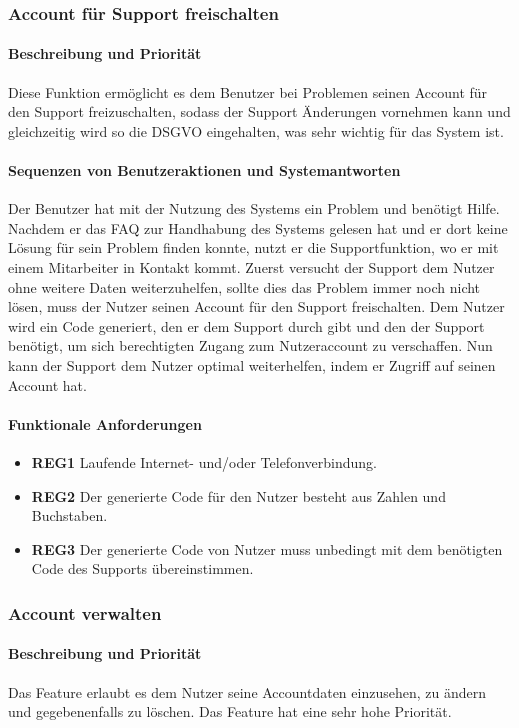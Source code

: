 \subsubsection{Account für Support freischalten}
\label{sys_feat:freischalten}
\paragraph{Beschreibung und Priorität}
Diese Funktion ermöglicht es dem Benutzer bei Problemen seinen Account für den Support freizuschalten, sodass der Support Änderungen vornehmen kann und gleichzeitig wird so die DSGVO eingehalten, was sehr wichtig für das System ist.
\paragraph{Sequenzen von Benutzeraktionen und Systemantworten} 
Der Benutzer hat mit der Nutzung des Systems ein Problem und benötigt Hilfe. Nachdem er das FAQ zur Handhabung des Systems gelesen hat und er dort keine Lösung für sein Problem finden konnte, nutzt er die Supportfunktion, wo er mit einem Mitarbeiter in Kontakt kommt. Zuerst versucht der Support dem Nutzer ohne weitere Daten weiterzuhelfen, sollte dies das Problem immer noch nicht lösen, muss der Nutzer seinen Account für den Support freischalten. Dem Nutzer wird ein Code generiert, den er dem Support durch gibt und den der Support benötigt, um sich berechtigten Zugang zum Nutzeraccount zu verschaffen. Nun kann der  Support dem Nutzer optimal weiterhelfen, indem er Zugriff auf seinen Account hat.
\paragraph{Funktionale Anforderungen}
\begin{itemize}
	\item \textbf{REG1} Laufende Internet- und/oder Telefonverbindung.
	\item \textbf{REG2} Der generierte Code für den Nutzer besteht aus Zahlen und Buchstaben.
	\item \textbf{REG3} Der generierte Code von Nutzer muss unbedingt mit dem benötigten Code des Supports übereinstimmen.
	
\end{itemize}

\subsubsection{Account verwalten}
\paragraph{Beschreibung und Priorität}
Das Feature erlaubt es dem Nutzer seine Accountdaten einzusehen, zu ändern und gegebenenfalls zu löschen. Das Feature hat eine sehr hohe Priorität.

